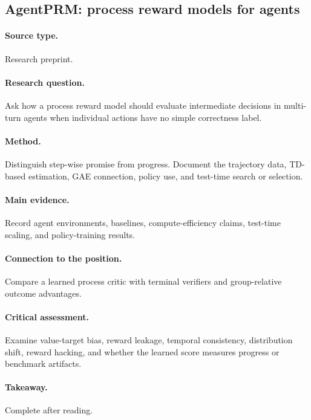 \subsection{AgentPRM: process reward models for agents \citep{xi2025agentprm}}
\paragraph{Source type.} Research preprint.
\paragraph{Research question.} Ask how a process reward model should evaluate intermediate decisions in multi-turn agents when individual actions have no simple correctness label.
\paragraph{Method.} Distinguish step-wise promise from progress. Document the trajectory data, TD-based estimation, GAE connection, policy use, and test-time search or selection.
\paragraph{Main evidence.} Record agent environments, baselines, compute-efficiency claims, test-time scaling, and policy-training results.
\paragraph{Connection to the position.} Compare a learned process critic with terminal verifiers and group-relative outcome advantages.
\paragraph{Critical assessment.} Examine value-target bias, reward leakage, temporal consistency, distribution shift, reward hacking, and whether the learned score measures progress or benchmark artifacts.
\paragraph{Takeaway.} Complete after reading.
